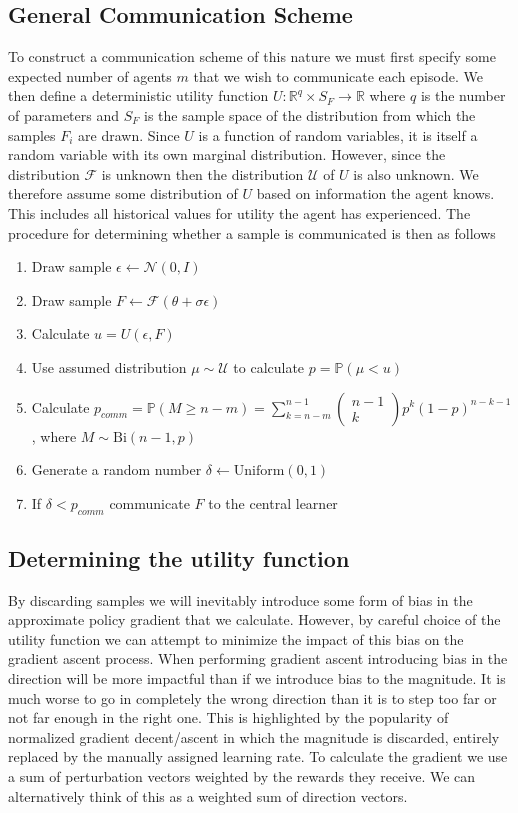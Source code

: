 \subsection{General Communication Scheme}
\label{sec:GeneralScheme}
To construct a communication scheme of this nature we must first specify some expected number of agents $m$ that we wish to communicate each episode.
We then define a deterministic utility function $U: \mathbb{R}^{q} \times S_F \rightarrow \mathbb{R}$ where $q$ is the number of parameters and $S_F$ is the sample space of the distribution from which the samples $F_i$ are drawn.
Since $U$ is a function of random variables, it is itself a random variable with its own marginal distribution. 
However, since the distribution $\mathcal{F}$ is unknown then the distribution $\mathcal{U}$ of $U$ is also unknown. 
We therefore assume some distribution of $U$ based on information the agent knows. 
This includes all historical values for utility the agent has experienced.
The procedure for determining whether a sample is communicated is then as follows
\begin{enumerate}
    \item Draw sample $\epsilon \leftarrow \mathcal{N}(0,I)$
    \item Draw sample $F \leftarrow \mathcal{F}(\theta + \sigma \epsilon)$
    \item Calculate $u = U(\epsilon,F)$
    \item Use assumed distribution $\mu \sim \mathcal{U}$ to calculate $p=\mathbb{P}(\mu < u)$
    \item Calculate $p_{comm}=\mathbb{P}(M \geq n-m) = \sum_{k=n-m}^{n-1} \begin{pmatrix}n-1 \\ k\end{pmatrix}p^k(1-p)^{n-k-1}$, where $M \sim \text{Bi}(n-1,p)$
    \item Generate a random number $\delta \leftarrow \text{Uniform}(0,1)$
    \item If $\delta<p_{comm}$ communicate $F$ to the central learner
\end{enumerate}

\subsection{Determining the utility function}
By discarding samples we will inevitably introduce some form of bias in the approximate policy gradient that we calculate. 
However, by careful choice of the utility function we can attempt to minimize the impact of this bias on the gradient ascent process.
When performing gradient ascent introducing bias in the direction will be more impactful than if we introduce bias to the magnitude. 
It is much worse to go in completely the wrong direction than it is to step too far or not far enough in the right one. 
This is highlighted by the popularity of normalized gradient decent/ascent \cite{NGD} in which the magnitude is discarded, entirely replaced by the manually assigned learning rate.
To calculate the gradient we use a sum of perturbation vectors weighted by the rewards they receive. We can alternatively think of this as a weighted sum of direction vectors.

